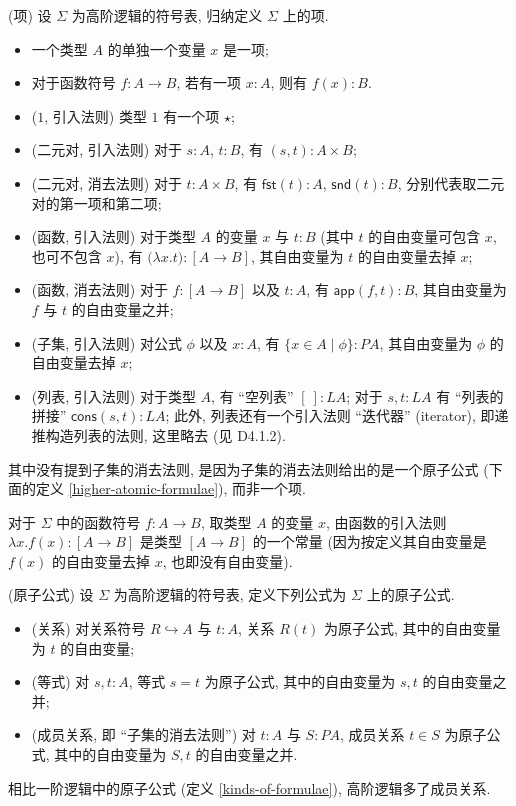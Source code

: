 \begin{definition}
	{(项)}
	设 $\Sigma$ 为高阶逻辑的符号表, 归纳定义 $\Sigma$ 上的项.
	\begin{itemize}
		\item 一个类型 $A$ 的单独一个变量 $x$ 是一项;
		\item 对于函数符号 $f \colon A \to B$, 若有一项 $x\colon A$, 则有 $f(x)\colon B$.
		\item ($1$, 引入法则) 类型 $1$ 有一个项 $\star$;
		\item (二元对, 引入法则) 对于 $s\colon A$, $t\colon B$, 有 $(s,t)\colon A\times B$;
		\item (二元对, 消去法则) 对于 $t\colon A\times B$, 有 $\mathsf {fst}(t)\colon A$, $\mathsf {snd}(t)\colon B$, 分别代表取二元对的第一项和第二项;
		\item (函数, 引入法则) 对于类型 $A$ 的变量 $x$ 与 $t\colon B$ (其中 $t$ 的自由变量可包含 $x$, 也可不包含 $x$), 有 $\big(\lambda {x} . t\big) \colon [A\to B]$, 其自由变量为 $t$ 的自由变量去掉 $x$;
		\item (函数, 消去法则) 对于 $f\colon [A\to B]$ 以及 $t\colon A$, 有 $\mathsf {app}(f,t)\colon B$, 其自由变量为 $f$ 与 $t$ 的自由变量之并;
		\item (子集, 引入法则) 对公式 $\phi$ 以及 $x\colon A$, 有 $\{x\in A \mid \phi\} \colon PA$, 其自由变量为 $\phi$ 的自由变量去掉 $x$;
		\item (列表, 引入法则) 对于类型 $A$, 有 ``空列表'' $[\ ]\colon LA$;
		对于 $s,t\colon LA$ 有 ``列表的拼接'' $\mathsf {cons}(s,t)\colon LA$; 此外, 列表还有一个引入法则 ``迭代器'' (iterator), 即递推构造列表的法则, 这里略去 (见 \cite{Elephant} D4.1.2).
	\end{itemize}
	其中没有提到子集的消去法则, 是因为子集的消去法则给出的是一个原子公式 (下面的定义 \ref{higher-atomic-formulae}), 而非一个项.
\end{definition}

对于 $\Sigma$ 中的函数符号 $f\colon A\to B$, 取类型 $A$ 的变量 $x$, 由函数的引入法则 $\lambda x.f(x)\colon [A\to B]$ 是类型 $[A\to B]$ 的一个常量 (因为按定义其自由变量是 $f(x)$ 的自由变量去掉 $x$, 也即没有自由变量).

\begin{definition}
	[label={higher-atomic-formulae}]
	{(原子公式)}
	设 $\Sigma$ 为高阶逻辑的符号表, 定义下列公式为 $\Sigma$ 上的原子公式.
	\begin{itemize}
		\item (关系) 对关系符号 $R\hookrightarrow A$ 与 $t\colon A$, 关系 $R(t)$ 为原子公式, 其中的自由变量为 $t$ 的自由变量;
		\item (等式) 对 $s,t\colon  A$, 等式 $s=t$ 为原子公式, 其中的自由变量为 $s,t$ 的自由变量之并;
		\item (成员关系, 即 ``子集的消去法则'') 对 $t\colon A$ 与 $S\colon PA$, 成员关系 $t\in S$ 为原子公式, 其中的自由变量为 $S,t$ 的自由变量之并.
	\end{itemize}
	相比一阶逻辑中的原子公式 (定义 \ref{kinds-of-formulae}), 高阶逻辑多了成员关系.
\end{definition}

